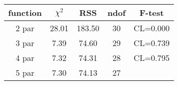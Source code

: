 \begin{tabular}{c|c|c|c|c}
function & $\chi^2$ & RSS & ndof & F-test \\
\hline
2 par & 28.01 & 183.50 & 30 & CL=0.000 \\
3 par & 7.39 & 74.60 & 29 & CL=0.739 \\
4 par & 7.32 & 74.31 & 28 & CL=0.795 \\
5 par & 7.30 & 74.13 & 27 & \\
\hline
\end{tabular}